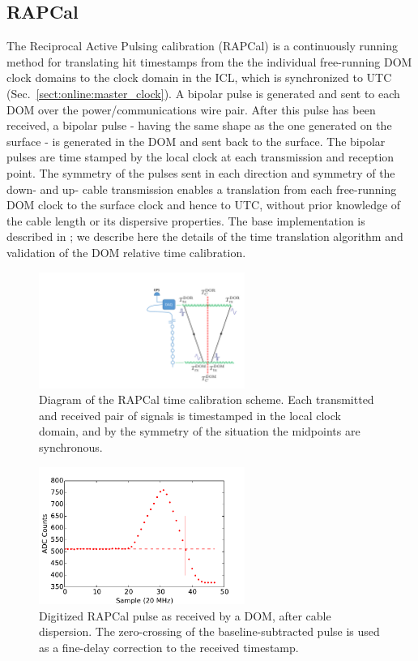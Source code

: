 \subsection{\label{sect:dom:rapcal}RAPCal}

The Reciprocal Active Pulsing calibration (RAPCal) is a
continuously running method for translating hit timestamps from the the
individual free-running DOM clock domains to the clock domain in the
ICL, which is synchronized to UTC
(Sec.~\ref{sect:online:master_clock}). A bipolar pulse is generated
and sent to each DOM over the power/communications wire pair.  After
this pulse has been received, a bipolar pulse - having the same shape
as the one generated on the surface - is generated in the DOM and sent
back to the surface.  The bipolar pulses are time stamped by the local
clock at each transmission and reception point.  The symmetry of the
pulses sent in each direction and symmetry of the down- and up- cable
transmission enables a translation from each free-running DOM clock to the surface clock and hence to UTC, without prior knowledge of the cable length or its dispersive properties. The base implementation is described in \cite{ICECUBE:DAQ}; we describe here the details of the time translation algorithm and validation of the DOM relative time calibration.

\begin{figure}[!h]
 \centering
 \includegraphics[width=0.6\textwidth]{graphics/dom/rapcal/rapcal_symmetry.pdf}
 \caption{Diagram of the RAPCal time calibration scheme.
   Each transmitted and received pair of signals is
   timestamped in the local clock domain, and by the symmetry of the
   situation the midpoints are synchronous.}
 \label{fig:rapcal_symmetry}
\end{figure}

\begin{figure}[h]
 \centering
 \includegraphics[width=0.6\textwidth]{graphics/dom/rapcal/dom_wf_zero_crossing.pdf}
 \caption{Digitized RAPCal pulse as received by a DOM, after cable dispersion.  The
   zero-crossing of the baseline-subtracted pulse is used as a fine-delay
   correction to the received timestamp.}
 \label{fig:rapcal_zero_crossing}
\end{figure}

